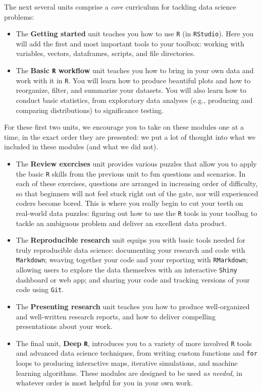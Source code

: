 \documentclass[
]{book}
\begin{document}
The next several units comprise a \emph{core} curriculum for tackling data science problems:

\begin{itemize}
\item
  The \textbf{Getting started} unit teaches you how to use \texttt{R} (in \texttt{RStudio}). Here you will add the first and most important tools to your toolbox: working with variables, vectors, dataframes, scripts, and file directories.
\item
  The \textbf{Basic \texttt{R} workflow} unit teaches you how to bring in your own data and work with it in \texttt{R}. You will learn how to produce beautiful plots and how to reorganize, filter, and summarize your datasets. You will also learn how to conduct basic statistics, from exploratory data analyses (e.g., producing and comparing distributions) to significance testing.
\end{itemize}

For these first two units, we encourage you to take on these modules one at a time, in the exact order they are presented: we put a lot of thought into what we included in these modules (and what we did not).

\begin{itemize}
\item
  The \textbf{Review exercises} unit provides various puzzles that allow you to apply the basic \texttt{R} skills from the previous unit to fun questions and scenarios. In each of these exercises, questions are arranged in increasing order of difficulty, so that beginners will not feel stuck right out of the gate, nor will experienced coders become bored. This is where you really begin to cut your teeth on real-world data puzzles: figuring out how to use the \texttt{R} tools in your toolbag to tackle an ambiguous problem and deliver an excellent data product.
\item
  The \textbf{Reproducible research} unit equips you with basic tools needed for truly reproducible data science: documenting your research and code with \texttt{Markdown}; weaving together your code and your reporting with \texttt{RMarkdown};
  allowing users to explore the data themselves with an interactive \texttt{Shiny} dashboard or web app; and sharing your code and tracking versions of your code using \texttt{Git}.
\item
  The \textbf{Presenting research} unit teaches you how to produce well-organized and well-written research reports, and how to deliver compelling presentations about your work.
\item
  The final unit, \textbf{Deep \texttt{R}}, introduces you to a variety of more involved \texttt{R} tools and advanced data science techniques, from writing custom functions and \texttt{for} loops to producing interactive maps, iterative simulations, and machine learning algorithms. These modules are designed to be used \emph{as needed}, in whatever order is most helpful for you in your own work.
\end{itemize}
\end{document}
